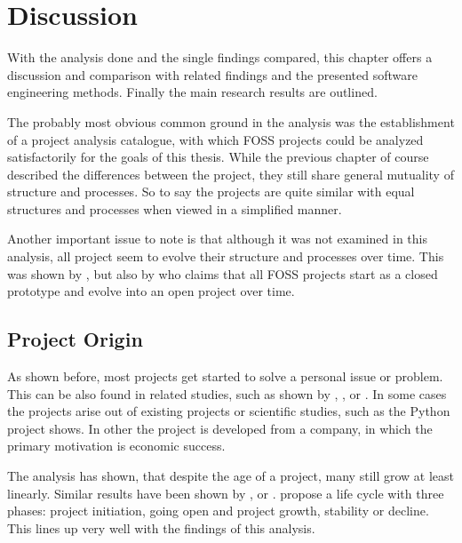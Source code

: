 \chapter{Discussion} %
\label{chap:discussion}

With the analysis done and the single findings compared, this chapter offers a
discussion and comparison with related findings and the presented software
engineering methods. Finally the main research results are outlined.

The probably most obvious common ground in the analysis was the establishment
of a project analysis catalogue, with which \ac{FOSS} projects could be
analyzed satisfactorily for the goals of this thesis. While the previous
chapter of course described the differences between the project, they still
share general mutuality of structure and processes. So to say the projects are
quite similar with equal structures and processes when viewed in a simplified
manner.

Another important issue to note is that although it was not examined in this
analysis, all project seem to evolve their structure and processes over time.
This was shown by \textcite{Scacchi2006}, \textcite{Godfrey2000} but also by
\textcite{Johnson2001} who claims that all \ac{FOSS} projects start as a closed
prototype and evolve into an open project over time.

\section{Project Origin} %

As shown before, most projects get started to solve a personal issue or
problem. This can be also found in related studies, such as shown by
\textcite{Raymond1998}, \textcite{Lakhani2003}, \cite{Hertel2003} or
\textcite{Johnson2001}. In some cases the projects arise out of existing
projects or scientific studies, such as the Python project shows. In other the
project is developed from a company, in which the primary motivation is
economic success.

The analysis has shown, that despite the age of a project, many still grow at
least linearly. Similar results have been shown by \textcite{Godfrey2000},
\textcite{Roets2007} or \textcite{Ogawa2007}. \textcite{Schweik2003} propose a
life cycle with three phases: project initiation, going open and project
growth, stability or decline. This lines up very well with the findings of this
analysis.


